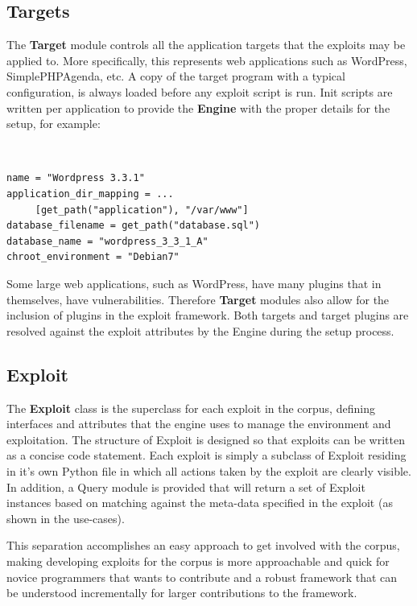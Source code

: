 \documentclass[letterpaper,twocolumn,10pt]{article}
\begin{document}
\subsection{Targets}
   The {\bf Target} module controls all the application targets that the exploits may be applied to.  More specifically, this represents web applications such as WordPress, SimplePHPAgenda, etc. A copy of the target program with a typical configuration, is always loaded before any exploit script is run.  Init scripts are written per application to provide the {\bf Engine} with the proper details for the setup, for example:

\begin{minipage}{\textwidth}
{\tt \footnotesize
\begin{lstlisting}
name = "Wordpress 3.3.1"
application_dir_mapping = ...
     [get_path("application"), "/var/www"]
database_filename = get_path("database.sql")
database_name = "wordpress_3_3_1_A"
chroot_environment = "Debian7"
\end{lstlisting}
} 
\end{minipage}


Some large web applications, such as WordPress, have many plugins that in themselves, have vulnerabilities. Therefore {\bf Target} modules also allow for the inclusion of plugins in the exploit framework. Both targets and target plugins are resolved against the exploit attributes by the Engine during the setup process. 


\subsection{Exploit}
The {\bf Exploit} class is the superclass for each exploit in the corpus, defining interfaces and attributes that the engine uses to manage the environment and exploitation. The structure of Exploit is designed so that exploits can be written as a concise code statement. Each exploit is simply a subclass of Exploit residing in it's own Python file in which all actions taken by the exploit are clearly visible. In addition, a Query module is provided that will return a set of Exploit instances based on matching against the meta-data specified in the exploit (as shown in the use-cases).\par

This separation accomplishes an easy approach to get involved with the corpus, making developing exploits for the corpus is more approachable and quick for novice programmers that wants to contribute and a robust framework that can be understood incrementally for larger contributions to the framework.\par
 
\end{document}
